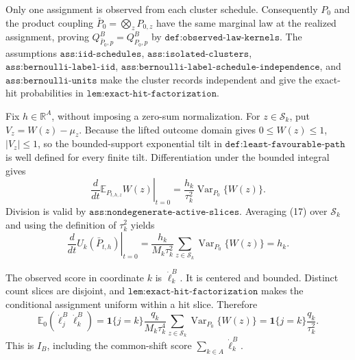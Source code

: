Only one assignment is observed from each cluster schedule.  Consequently \(P_0\) and the product coupling \(\bar P_0=\bigotimes_zP_{0,z}\) have the same marginal law at the realized assignment, proving \(Q^B_{\bar P_0,p}=Q^B_{P_0,p}\) by \(\texttt{def:observed-law-kernels}\).  The assumptions \(\texttt{ass:iid-schedules}\), \(\texttt{ass:isolated-clusters}\), \(\texttt{ass:bernoulli-label-iid}\), \(\texttt{ass:bernoulli-label-schedule-independence}\), and \(\texttt{ass:bernoulli-units}\) make the cluster records independent and give the exact-hit probabilities in \(\texttt{lem:exact-hit-factorization}\).

Fix \(h\in\mathbb R^A\), without imposing a zero-sum normalization.  For \(z\in\mathcal S_k\), put \(V_z=W(z)-\mu_z\).  Because the lifted outcome domain gives \(0\leq W(z)\leq1\), \(|V_z|\leq1\), so the bounded-support exponential tilt in \(\texttt{def:least-favourable-path}\) is well defined for every finite tilt.  Differentiation under the bounded integral gives
\[
\left.\frac{d}{dt}\mathbb E_{P_{t,h,z}}W(z)\right|_{t=0}
=\frac{h_k}{\tau_k^2}\operatorname{Var}_{P_0}\{W(z)\}. \tag{17}
\]
Division is valid by \(\texttt{ass:nondegenerate-active-slices}\).  Averaging (17) over \(\mathcal S_k\) and using the definition of \(\tau_k^2\) yields
\[
\left.\frac d{dt}U_k(\bar P_{t,h})\right|_{t=0}
=\frac{h_k}{M_k\tau_k^2}\sum_{z\in\mathcal S_k}
  \operatorname{Var}_{P_0}\{W(z)\}=h_k. \tag{18}
\]

The observed score in coordinate \(k\) is \(\dot\ell_k^B\).  It is centered and bounded.  Distinct count slices are disjoint, and \(\texttt{lem:exact-hit-factorization}\) makes the conditional assignment uniform within a hit slice.  Therefore
\[
\mathbb E_0(\dot\ell_j^B\dot\ell_k^B)
=\mathbf1\{j=k\}\frac{q_k}{M_k\tau_k^4}
  \sum_{z\in\mathcal S_k}\operatorname{Var}_{P_0}\{W(z)\}
=\mathbf1\{j=k\}\frac{q_k}{\tau_k^2}. \tag{19}
\]
This is \(I_B\), including the common-shift score \(\sum_{k\in A}\dot\ell_k^B\).


